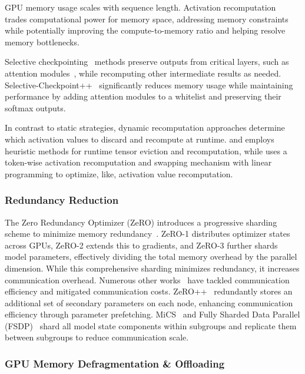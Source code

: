 GPU memory usage scales with sequence length. Activation recomputation~\citep{chen2016training, chen2024optimizing} trades computational power for memory space, addressing memory constraints while potentially improving the compute-to-memory ratio and helping resolve memory bottlenecks.

Selective checkpointing~\citep{korthikanti2023reducing, torch2024selective} methods preserve outputs from critical layers, such as attention modules~\citep{li2024distflashattn}, while recomputing other intermediate results as needed. Selective-Checkpoint++~\citep{gu2024loongtrain} significantly reduces memory usage while maintaining performance by adding attention modules to a whitelist and preserving their softmax outputs.

In contrast to static strategies, dynamic recomputation approaches determine which activation values to discard and recompute at runtime. \citet{Kirisame2020DynamicTR} and \citet{Hu2022MegTaiChiDT} employs heuristic methods for runtime tensor eviction and recomputation, while \citet{zhao2024efficientlytraining7bllm} uses a token-wise activation recomputation and swapping mechanism with linear programming to optimize, like, activation value recomputation.

\subsubsection{Redundancy Reduction}

The Zero Redundancy Optimizer (ZeRO) introduces a progressive sharding scheme to minimize memory redundancy~\citep{rajbhandari2020zero}. ZeRO-1 distributes optimizer states across GPUs, ZeRO-2 extends this to gradients, and ZeRO-3 further shards model parameters, effectively dividing the total memory overhead by the parallel dimension. While this comprehensive sharding minimizes redundancy, it increases communication overhead. Numerous other works~\citep{wu2023rethinking, luo2023rtp, chen2024lins} have tackled communication efficiency and mitigated communication costs. ZeRO++~\citep{wang2023zero++} redundantly stores an additional set of secondary parameters on each node, enhancing communication efficiency through parameter prefetching. MiCS~\citep{Zhang2022MiCSNS} and Fully Sharded Data Parallel (FSDP)~\citep{zhao2023pytorch} shard all model state components within subgroups and replicate them between subgroups to reduce communication scale. 

\subsubsection{GPU Memory Defragmentation \& Offloading}

